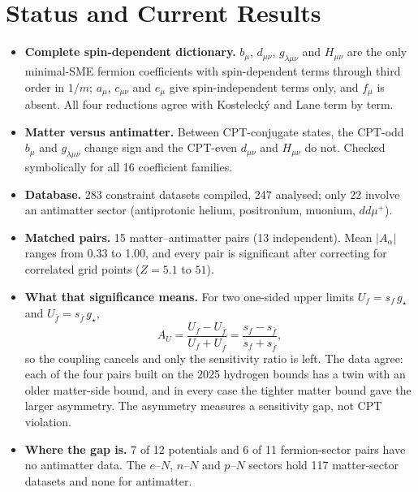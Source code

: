 \documentclass[10pt,a4paper]{article}
\newcommand{\fbar}{\bar f}
\begin{document}
\section*{Status and Current Results}
\begin{itemize}
  \item \textbf{Complete spin-dependent dictionary.} $b_\mu$, $d_{\mu\nu}$,
    $g_{\lambda\mu\nu}$ and $H_{\mu\nu}$ are the only minimal-SME fermion
    coefficients with spin-dependent terms through third order in $1/m$;
    $a_\mu$, $c_{\mu\nu}$ and $e_\mu$ give spin-independent terms only, and
    $f_\mu$ is absent. All four reductions agree with Kosteleck\'y and Lane
    term by term.
  \item \textbf{Matter versus antimatter.} Between CPT-conjugate states, the
    CPT-odd $b_\mu$ and $g_{\lambda\mu\nu}$ change sign and the CPT-even
    $d_{\mu\nu}$ and $H_{\mu\nu}$ do not. Checked symbolically for all 16
    coefficient families.
  \item \textbf{Database.} 283 constraint datasets compiled, 247 analysed;
    only 22 involve an antimatter sector (antiprotonic helium, positronium,
    muonium, $dd\mu^+$).
  \item \textbf{Matched pairs.} 15 matter--antimatter pairs (13
    independent). Mean $|A_\alpha|$ ranges from 0.33 to 1.00, and every pair
    is significant after correcting for correlated grid points
    ($Z = 5.1$ to $51$).
  \item \textbf{What that significance means.} For two one-sided upper limits
    $U_f = s_f\,g_\star$ and $U_{\fbar} = s_{\fbar}\,g_\star$,
    \[
      A_U = \frac{U_f - U_{\fbar}}{U_f + U_{\fbar}}
          = \frac{s_f - s_{\fbar}}{s_f + s_{\fbar}} ,
    \]
    so the coupling cancels and only the sensitivity ratio is left. The data
    agree: each of the four pairs built on the 2025 hydrogen bounds has a twin
    with an older matter-side bound, and in every case the tighter matter
    bound gave the larger asymmetry. The asymmetry measures a sensitivity gap,
    not CPT violation.
  \item \textbf{Where the gap is.} 7 of 12 potentials and 6 of 11
    fermion-sector pairs have no antimatter data. The $e$--$N$, $n$--$N$ and
    $p$--$N$ sectors hold 117 matter-sector datasets and none for antimatter.
\end{itemize}
\end{document}
